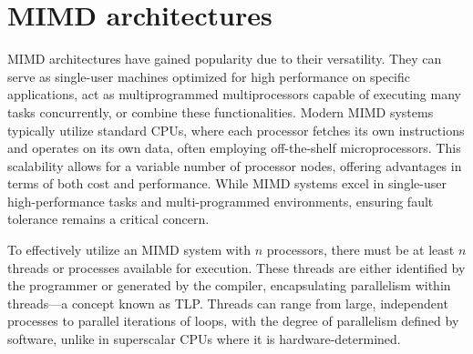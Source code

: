 \section{MIMD architectures}

MIMD architectures have gained popularity due to their versatility.
They can serve as single-user machines optimized for high performance on specific applications, act as multiprogrammed multiprocessors capable of executing many tasks concurrently, or combine these functionalities.
Modern MIMD systems typically utilize standard CPUs, where each processor fetches its own instructions and operates on its own data, often employing off-the-shelf microprocessors. 
This scalability allows for a variable number of processor nodes, offering advantages in terms of both cost and performance. 
While MIMD systems excel in single-user high-performance tasks and multi-programmed environments, ensuring fault tolerance remains a critical concern.

To effectively utilize an MIMD system with $n$ processors, there must be at least $n$ threads or processes available for execution. 
These threads are either identified by the programmer or generated by the compiler, encapsulating parallelism within threads—a concept known as TLP. 
Threads can range from large, independent processes to parallel iterations of loops, with the degree of parallelism defined by software, unlike in superscalar CPUs where it is hardware-determined.


